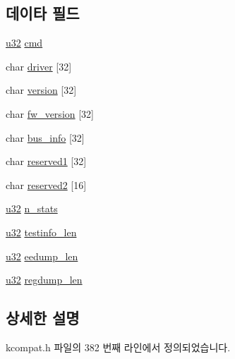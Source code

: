 \subsection*{데이타 필드}
\begin{DoxyCompactItemize}
\item 
\hyperlink{lib_2igb_2e1000__osdep_8h_a64e91c10a0d8fb627e92932050284264}{u32} \hyperlink{structk__ethtool__drvinfo_a62fe2a1dbf17d5a8561a5a7f5a97a9ba}{cmd}
\item 
char \hyperlink{structk__ethtool__drvinfo_afac9f4c4678975b69081b0448fff5858}{driver} \mbox{[}32\mbox{]}
\item 
char \hyperlink{structk__ethtool__drvinfo_ab7531ce77b74db0a0cd64c1ab1f69e72}{version} \mbox{[}32\mbox{]}
\item 
char \hyperlink{structk__ethtool__drvinfo_a0c0348cd3d20dead23c571d91ca11a8f}{fw\+\_\+version} \mbox{[}32\mbox{]}
\item 
char \hyperlink{structk__ethtool__drvinfo_a31896ac61b14fbde921b20c78b4df58d}{bus\+\_\+info} \mbox{[}32\mbox{]}
\item 
char \hyperlink{structk__ethtool__drvinfo_a6070532541867232a8dfe5362db10bff}{reserved1} \mbox{[}32\mbox{]}
\item 
char \hyperlink{structk__ethtool__drvinfo_a523d14f136475fa10dcd5857826b604a}{reserved2} \mbox{[}16\mbox{]}
\item 
\hyperlink{lib_2igb_2e1000__osdep_8h_a64e91c10a0d8fb627e92932050284264}{u32} \hyperlink{structk__ethtool__drvinfo_a2b16bc73f229056a84b161491538fedd}{n\+\_\+stats}
\item 
\hyperlink{lib_2igb_2e1000__osdep_8h_a64e91c10a0d8fb627e92932050284264}{u32} \hyperlink{structk__ethtool__drvinfo_a25068122b5d9b16cbe764bf7bbce5599}{testinfo\+\_\+len}
\item 
\hyperlink{lib_2igb_2e1000__osdep_8h_a64e91c10a0d8fb627e92932050284264}{u32} \hyperlink{structk__ethtool__drvinfo_abbd0b2dee844b73294f6134755f8b454}{eedump\+\_\+len}
\item 
\hyperlink{lib_2igb_2e1000__osdep_8h_a64e91c10a0d8fb627e92932050284264}{u32} \hyperlink{structk__ethtool__drvinfo_abb1429e365f206b0f1fbbe870fe26dde}{regdump\+\_\+len}
\end{DoxyCompactItemize}


\subsection{상세한 설명}


kcompat.\+h 파일의 382 번째 라인에서 정의되었습니다.



